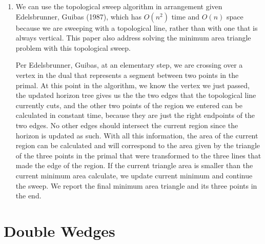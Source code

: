 \documentclass [12pt]{article}
\begin{document}
\begin{enumerate}[label=\alph*.]
        \pagebreak

        \item We can use the topological sweep algorithm in arrangement given Edelsbrunner, Guibas (1987), which has $O(n^2)$ time and $O(n)$ space because we are sweeping with a topological line, rather than with one that is always vertical. This paper also address solving the minimum area triangle problem with this topological sweep.
        
        Per Edelsbrunner, Guibas, at an elementary step, we are crossing over a vertex in the dual that represents a segment between two points in the primal. At this point in the algorithm, we know the vertex we just passed, the updated horizon tree gives us the the two edges that the topological line currently cuts, and the other two points of the region we entered can be calculated in constant time, because they are just the right endpoints of the two edges. No other edges should intersect the current region since the horizon is updated as such. With all this information, the area of the current region can be calculated and will correspond to the area given by the triangle of the three points in the primal that were transformed to the three lines that made the edge of the region. If the current triangle area is smaller than the current minimum area calculate, we update current minimum and continue the sweep. We report the final minimum area triangle and its three points in the end. 
       
    \end{enumerate}


        
    \pagebreak



    \section{Double Wedges}
    \label{sec:three}
\end{document}
